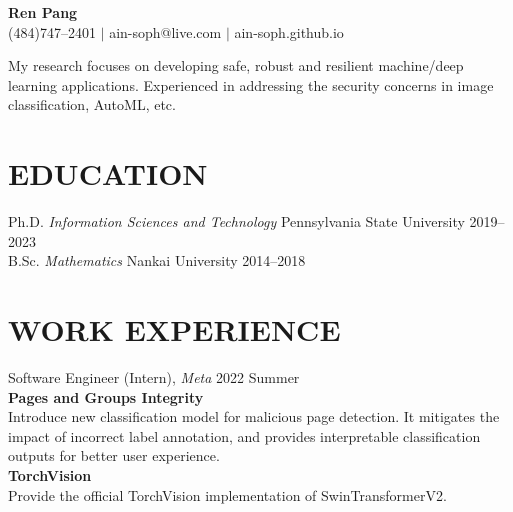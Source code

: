 \documentclass[letterpaper,11pt]{article}
\begin{document}
\begin{center}
    \textbf{\Huge Ren Pang} \\ \vspace{5pt}
    \small \faPhone* (484)747--2401 \hspace{1pt} $|$
    \hspace{1pt} \faEnvelope\hspace{2pt}ain-soph@live.com \hspace{1pt} $|$ 
    \hspace{1pt} \faGithub\hspace{2pt}ain-soph.github.io
    \\ \vspace{0pt}
\end{center}

\noindent
My research focuses on developing safe, robust and resilient machine/deep learning applications. Experienced in addressing the security concerns in image classification, AutoML, etc.

\section{EDUCATION}
Ph.D. \hspace{1em} \textit{Information Sciences and Technology} \hspace{1em} Pennsylvania State University \hfill 2019--2023 \\
B.Sc. \hspace{1em} \textit{Mathematics} \hspace{11.8em} Nankai University \hfill 2014--2018

\section{WORK EXPERIENCE}
Software Engineer (Intern), \textit{Meta}  \hfill 2022 Summer\vspace{3pt}\\
\textbf{Pages and Groups Integrity}\\
Introduce new classification model for malicious page detection. It mitigates the impact of incorrect label annotation, and provides interpretable classification outputs for better user experience. \vspace{0.8em}\\
\textbf{TorchVision}\\
Provide the official TorchVision implementation of SwinTransformerV2.
\end{document}
